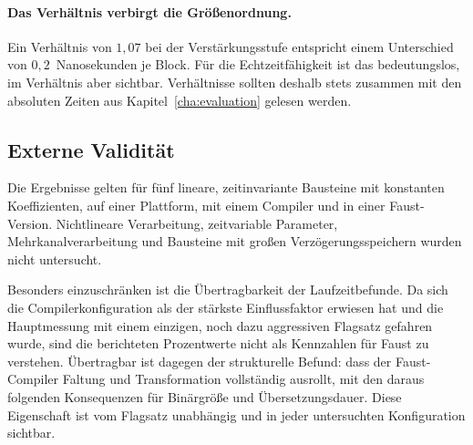 \paragraph{Das Verhältnis verbirgt die Größenordnung.}
Ein Verhältnis von $1{,}07$ bei der Verstärkungsstufe entspricht einem Unterschied von $0{,}2$~Nanosekunden je Block. Für die Echtzeitfähigkeit ist das bedeutungslos, im Verhältnis aber sichtbar. Verhältnisse sollten deshalb stets zusammen mit den absoluten Zeiten aus Kapitel~\ref{cha:evaluation} gelesen werden.

\subsection{Externe Validität}

Die Ergebnisse gelten für fünf lineare, zeitinvariante Bausteine mit konstanten Koeffizienten, auf einer Plattform, mit einem Compiler und in einer Faust-Version. Nichtlineare Verarbeitung, zeitvariable Parameter, Mehrkanalverarbeitung und Bausteine mit großen Verzögerungsspeichern wurden nicht untersucht.

Besonders einzuschränken ist die Übertragbarkeit der Laufzeitbefunde. Da sich die Compilerkonfiguration als der stärkste Einflussfaktor erwiesen hat und die Hauptmessung mit einem einzigen, noch dazu aggressiven Flagsatz gefahren wurde, sind die berichteten Prozentwerte nicht als Kennzahlen für Faust zu verstehen. Übertragbar ist dagegen der strukturelle Befund: dass der Faust-Compiler Faltung und Transformation vollständig ausrollt, mit den daraus folgenden Konsequenzen für Binärgröße und Übersetzungsdauer. Diese Eigenschaft ist vom Flagsatz unabhängig und in jeder untersuchten Konfiguration sichtbar.
